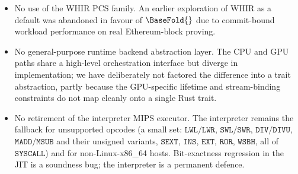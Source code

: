 \begin{itemize}
  \item No use of the WHIR PCS family. An earlier exploration of WHIR as a default was abandoned in favour of $\BaseFold{}$ due to commit-bound workload performance on real Ethereum-block proving.
  \item No general-purpose runtime backend abstraction layer. The CPU and GPU paths share a high-level orchestration interface but diverge in implementation; we have deliberately not factored the difference into a trait abstraction, partly because the GPU-specific lifetime and stream-binding constraints do not map cleanly onto a single Rust trait.
  \item No retirement of the interpreter MIPS executor. The interpreter remains the fallback for unsupported opcodes (a small set: $\mathtt{LWL}/\mathtt{LWR}$, $\mathtt{SWL}/\mathtt{SWR}$, $\mathtt{DIV}/\mathtt{DIVU}$, $\mathtt{MADD}/\mathtt{MSUB}$ and their unsigned variants, $\mathtt{SEXT}$, $\mathtt{INS}$, $\mathtt{EXT}$, $\mathtt{ROR}$, $\mathtt{WSBH}$, all of $\mathtt{SYSCALL}$) and for non-Linux-x86\_64 hosts. Bit-exactness regression in the JIT is a soundness bug; the interpreter is a permanent defence.
\end{itemize}
